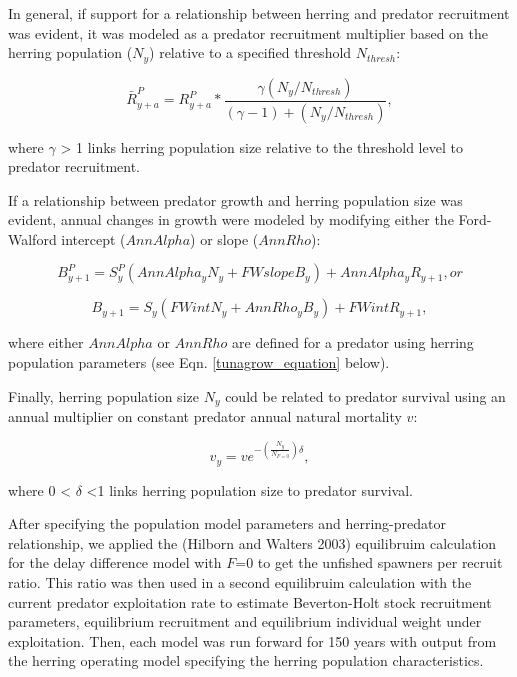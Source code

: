 \documentclass[]{article}
\begin{document}
In general, if support for a relationship between herring and predator
recruitment was evident, it was modeled as a predator recruitment
multiplier based on the herring population (\(N_{y}\)) relative to a
specified threshold \(N_{thresh}\):

\begin{equation}
\bar{R}_{y+a}^P = R_{y+a}^P  * \frac{\gamma(N_{y}/N_{thresh})}{(\gamma-1)+(N_{y}/N_{thresh})} \label{recwithherring_equation}, 
\end{equation}

where \(\gamma\) \textgreater{} 1 links herring population size relative
to the threshold level to predator recruitment.

If a relationship between predator growth and herring population size
was evident, annual changes in growth were modeled by modifying either
the Ford-Walford intercept (\(AnnAlpha\)) or slope (\(AnnRho\)):

\begin{equation}
B_{y+1}^P = S_{y}^P (AnnAlpha_{y} N_{y} + FWslope B_{y}) + AnnAlpha_{y}R_{y+1}, or
\end{equation}

\begin{equation}
B_{y+1} = S_{y} (FWint N_{y} + AnnRho_{y} B_{y}) + FWint R_{y+1}, 
\end{equation}

where either \(AnnAlpha\) or \(AnnRho\) are defined for a predator using
herring population parameters (see Eqn. \ref{tunagrow_equation} below).

Finally, herring population size \(N_{y}\) could be related to predator
survival using an annual multiplier on constant predator annual natural
mortality \(v\):

\begin{equation}
v_{y} =  v e ^ {-(\frac{N_{y}}{N_{F=0}})\delta} \label{varmort_equation},
\end{equation}

where 0 \textless{} \(\delta\) \textless{}1 links herring population
size to predator survival.

After specifying the population model parameters and herring-predator
relationship, we applied the (Hilborn and Walters 2003) equilibruim
calculation for the delay difference model with \(F\)=0 to get the
unfished spawners per recruit ratio. This ratio was then used in a
second equilibruim calculation with the current predator exploitation
rate to estimate Beverton-Holt stock recruitment parameters, equilibrium
recruitment and equilibrium individual weight under exploitation. Then,
each model was run forward for 150 years with output from the herring
operating model specifying the herring population characteristics.
\end{document}
